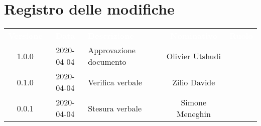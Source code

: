 \section*{Registro delle modifiche}
{
	\centering
	\begin{longtable}{ c c  C{4cm}  c  c }
		\textcolor{white}{\textbf{Versione}} & \textcolor{white}{\textbf{Data}} & \textcolor{white}{\textbf{Descrizione}} & \textcolor{white}{\textbf{Nominativo}} & \textcolor{white}{\textbf{Ruolo}}\\		
		1.0.0 & 2020-04-04 & Approvazione documento & Olivier Utshudi & \RdP{}\\
		0.1.0 & 2020-04-04 & Verifica verbale & Zilio Davide & \ver{} \\
		0.0.1 & 2020-04-04 & Stesura verbale & Simone Meneghin &\reda{}\\		
		
	\end{longtable}

}